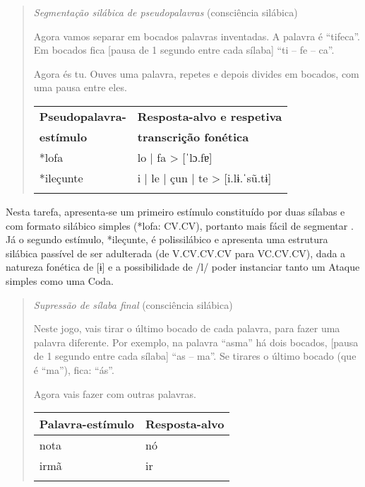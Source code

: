 \documentclass[output=paper,colorlinks,citecolor=brown,booklanguage=portuguese]{langscibook}
\begin{document}
\begin{quote}
\textit{Segmentação silábica de pseudopalavras} (consciência silábica)

Agora vamos separar em bocados palavras inventadas. A palavra é “tifeca”. Em bocados fica [pausa de 1 segundo entre cada sílaba] “ti – fe – ca”.

Agora és tu. Ouves uma palavra, repetes e depois divides em bocados, com uma pausa entre eles.



\begin{Tabela}
\begin{tabularx}{.8\textwidth}{Xl}
\lsptoprule
\textbf{Pseudopalavra-} & \textbf{Resposta-alvo e respetiva }\\
\textbf{estímulo} & \textbf{transcrição fonética}\\
\midrule
*lofa & lo | fa  >  [ˈlɔ.fɐ]\\
*ileçunte & i | le | çun | te  >  [i.lɨ.ˈsũ.tɨ]\\
\lspbottomrule
\end{tabularx}
\end{Tabela}

\end{quote}

Nesta tarefa, apresenta-se um primeiro estímulo constituído por duas sílabas e com formato silábico simples (*lofa: CV.CV), portanto mais fácil de segmentar \citep{Afonso2015}. Já o segundo estímulo, *ileçunte, é polissilábico e apresenta uma estrutura silábica passível de ser adulterada (de V.CV.CV.CV para VC.CV.CV), dada a natureza fonética de [ɨ] e a possibilidade de /l/ poder instanciar tanto um Ataque simples como uma Coda.

\begin{quote}
\textit{Supressão de sílaba final} (consciência silábica)

Neste jogo, vais tirar o último bocado de cada palavra, para fazer uma palavra diferente. Por exemplo, na palavra “asma” há dois bocados, [pausa de 1 segundo entre cada sílaba] {“as – ma”. Se tirares o último bocado (que é “ma”), fica: “ás”.}

Agora vais fazer com outras palavras.



\begin{Tabela}
\begin{tabularx}{.8\textwidth}{Xl}
\lsptoprule
\textbf{Palavra-estímulo} & \textbf{Resposta-alvo}\\
\midrule
nota & nó\\
irmã & ir\\
\lspbottomrule
\end{tabularx}
\end{Tabela}

\end{quote}
\end{document}
